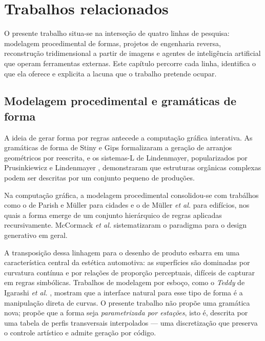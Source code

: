 \chapter{Trabalhos relacionados}\label{ch:relacionados}

O presente trabalho situa-se na interse\c{c}\~ao de quatro linhas de pesquisa: modelagem
procedimental de formas, projetos de engenharia reversa, reconstru\c{c}\~ao tridimensional a
partir de imagens e agentes de intelig\^encia artificial que operam ferramentas externas. Este
cap\'itulo percorre cada linha, identifica o que ela oferece e explicita a lacuna que o
trabalho pretende ocupar.

\section{Modelagem procedimental e gram\'aticas de forma}

A ideia de gerar forma por regras antecede a computa\c{c}\~ao gr\'afica interativa. As
gram\'aticas de forma de Stiny e Gips \cite{stiny1972} formalizaram a gera\c{c}\~ao de arranjos
geom\'etricos por reescrita, e os sistemas-L de Lindenmayer, popularizados por Prusinkiewicz e
Lindenmayer \cite{prusinkiewicz1990}, demonstraram que estruturas org\^anicas complexas podem ser
descritas por um conjunto pequeno de produ\c{c}\~oes.

Na computa\c{c}\~ao gr\'afica, a modelagem procedimental consolidou-se com trab\'alhos como o de
Parish e M\"uller \cite{parish2001} para cidades e o de M\"uller \emph{et al.}
\cite{muller2006} para edif\'icios, nos quais a forma emerge de um conjunto hier\'arquico de
regras aplicadas recursivamente. McCormack \emph{et al.} \cite{mccormack2004} sistematizaram o
paradigma para o design generativo em geral.

A transposi\c{c}\~ao dessa linhagem para o desenho de produto esbarra em uma caracter\'istica
central da est\'etica automotiva: as superf\'icies s\~ao dominadas por curvatura cont\'inua e
por rela\c{c}\~oes de propor\c{c}\~ao perceptuais, dif\'iceis de capturar em regras simb\'olicas.
Trabalhos de modelagem por esbo\c{c}o, como o \emph{Teddy} de Igarashi \emph{et al.}
\cite{igarashi1999}, mostram que a interface natural para esse tipo de forma \'e a manipula\c{c}\~ao
direta de curvas. O presente trabalho n\~ao prop\~oe uma gram\'atica nova; prop\~oe que a forma
seja \emph{parametrizada por esta\c{c}\~oes}, isto \'e, descrita por uma tabela de perfis
transversais interpolados --- uma discretiza\c{c}\~ao que preserva o controle art\'istico e
admite gera\c{c}\~ao por c\'odigo.

